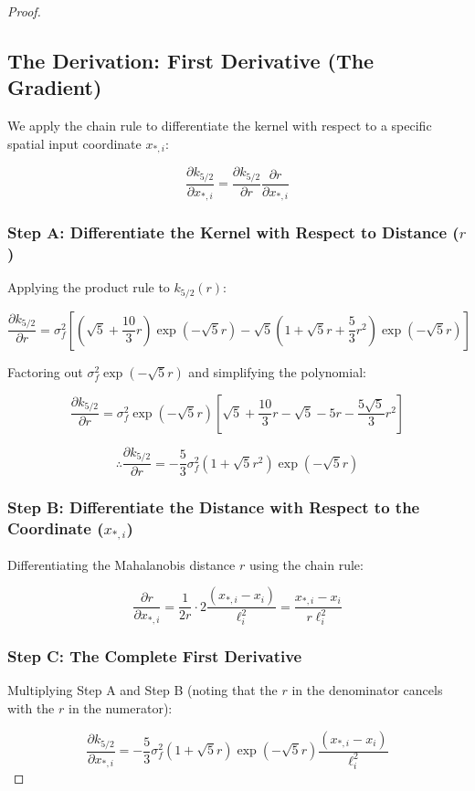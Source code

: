 \documentclass[12pt,oneside]{report}
\theoremstyle{definition}
\theoremstyle{remark}
\begin{document}
\begin{proof}
\subsection{The Derivation: First Derivative (The Gradient)}

We apply the chain rule to differentiate the kernel with respect to a specific spatial input coordinate $x_{*, i}$:

$$\frac{\partial k_{5/2}}{\partial x_{*, i}} = \frac{\partial k_{5/2}}{\partial r} \frac{\partial r}{\partial x_{*, i}}$$


\subsubsection{Step A: Differentiate the Kernel with Respect to Distance ($r$)}
Applying the product rule to $k_{5/2}(r)$:

$$\frac{\partial k_{5/2}}{\partial r} = \sigma_f^2 \left[\left(\sqrt{5} + \frac{10}{3}r\right) \exp(-\sqrt{5}r) - \sqrt{5} \left(1 + \sqrt{5}r + \frac{5}{3}r^2\right) \exp(-\sqrt{5}r) \right]$$

Factoring out $\sigma_f^2 \exp(-\sqrt{5}r)$ and simplifying the polynomial:

$$\frac{\partial k_{5/2}}{\partial r} = \sigma_f^2 \exp(-\sqrt{5}r) \left[ \sqrt{5} + \frac{10}{3}r - \sqrt{5} - 5r - \frac{5\sqrt{5}}{3}r^2 \right]$$

$$\therefore \frac{\partial k_{5/2}}{\partial r} = -\frac{5}{3} \sigma_f^2 (1 + \sqrt{5}r^2) \exp(-\sqrt{5}r)$$


\subsubsection{Step B: Differentiate the Distance with Respect to the Coordinate ($x_{*, i}$)}
Differentiating the Mahalanobis distance $r$ using the chain rule:

$$\frac{\partial r}{\partial x_{*, i}} = \frac{1}{2r} \cdot 2 \frac{(x_{*, i} - x_i)}{\ell_i^2} = \frac{x_{*, i} - x_i}{r \ell_i^2}$$


\subsubsection{Step C: The Complete First Derivative}
Multiplying Step A and Step B (noting that the $r$ in the denominator cancels with the $r$ in the numerator):

$$\frac{\partial k_{5/2}}{\partial x_{*, i}} = -\frac{5}{3} \sigma_f^2 (1 + \sqrt{5}r) \exp(-\sqrt{5}r) \frac{(x_{*, i} - x_i)}{\ell_i^2}$$


\end{proof}
\end{document}
